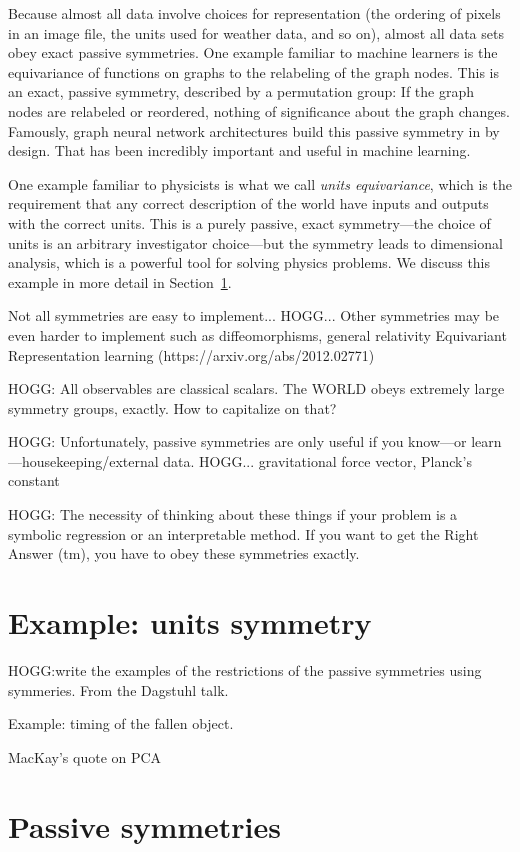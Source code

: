 \documentclass{article}
\theoremstyle{plain}
\theoremstyle{definition}
\theoremstyle{remark}
\newcommand{\sectionname}{Section}
\newcommand{\secref}[1]{\sectionname~\ref{#1}}
\begin{document}
Because almost all data involve choices for representation (the ordering of pixels in an image file, the units used for weather data, and so on), almost all data sets obey exact passive symmetries.
One example familiar to machine learners is the equivariance of functions on graphs to the relabeling of the graph nodes.
This is an exact, passive symmetry, described by a permutation group:
If the graph nodes are relabeled or reordered, nothing of significance about the graph changes.
Famously, graph neural network architectures build this passive symmetry in by design.
That has been incredibly important and useful in machine learning.

One example familiar to physicists is what we call \emph{units equivariance}, which is the requirement that any correct description of the world have inputs and outputs with the correct units.
This is a purely passive, exact symmetry---the choice of units is an arbitrary investigator choice---but the symmetry leads to dimensional analysis, which is a powerful tool for solving physics problems.
We discuss this example in more detail in \secref{sec:units}.

Not all symmetries are easy to implement... HOGG... Other symmetries may be even harder to implement such as diffeomorphisms, general relativity
Equivariant Representation learning (https://arxiv.org/abs/2012.02771)
   
HOGG: All observables are classical scalars. The WORLD obeys extremely large symmetry groups, exactly. How to capitalize on that?

HOGG: Unfortunately, passive symmetries are only useful if you know---or learn---housekeeping/external data. HOGG... gravitational force vector, Planck's constant

HOGG: The necessity of thinking about these things if your problem is a symbolic regression or an interpretable method. If you want to get the Right Answer (tm), you have to obey these symmetries exactly.

\section{Example: units symmetry}\label{sec:units}
HOGG:write the examples of the restrictions of the passive symmetries using symmeries. From the Dagstuhl talk.

Example: timing of the fallen object.

 MacKay's quote on PCA

\section{Passive symmetries}\label{sec:definitions}
\end{document}
